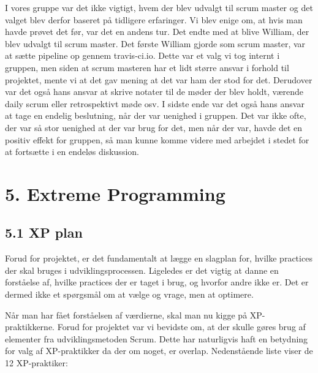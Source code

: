 \documentclass[11pt]{report}
\begin{document}
I vores gruppe var det ikke vigtigt, hvem der blev udvalgt til scrum master og det valget blev derfor baseret på tidligere erfaringer. Vi blev enige om, at hvis man havde prøvet det før, var det en andens tur. Det endte med at blive William, der blev udvalgt til scrum master. Det første  William gjorde som scrum master, var at sætte pipeline op gennem travis-ci.io. Dette var et valg vi tog internt i gruppen, men siden at scrum masteren har et lidt større ansvar i forhold til projektet, mente vi at det gav mening at det var ham der stod for det. Derudover var det også hans ansvar at skrive notater til de møder der blev holdt, værende daily scrum eller retrospektivt møde osv. I sidste ende var det også hans ansvar at tage en endelig beslutning, når der var uenighed i gruppen. Det var ikke ofte, der var så stor uenighed at der var brug for det, men når der var, havde det en positiv effekt for gruppen, så man kunne komme videre med arbejdet i stedet for at fortsætte i en endeløs diskussion. 

\chapter*{5. Extreme Programming}
\section*{5.1 XP plan}
Forud for projektet, er det fundamentalt at lægge en slagplan for, hvilke practices der skal bruges i udviklingsprocessen. Ligeledes er det vigtig at danne en forståelse af, hvilke practices der er taget i brug, og hvorfor andre ikke er. Det er dermed ikke et spørgsmål om at vælge og vrage, men at optimere.

Når man har fået forståelsen af værdierne, skal man nu kigge på XP-praktikkerne. Forud for projektet var vi bevidste om, at der skulle gøres brug af elementer fra udviklingsmetoden Scrum. Dette har naturligvis haft en betydning for valg af XP-praktikker da der om noget, er overlap. Nedenstående liste viser de 12 XP-praktiker:
\end{document}
